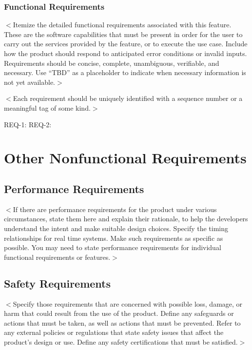 \documentclass{scrreprt}
\begin{document}
\subsection{Functional Requirements}
$<$Itemize the detailed functional requirements associated with this feature.  
These are the software capabilities that must be present in order for the user 
to carry out the services provided by the feature, or to execute the use case.  
Include how the product should respond to anticipated error conditions or 
invalid inputs. Requirements should be concise, complete, unambiguous, 
verifiable, and necessary. Use “TBD” as a placeholder to indicate when necessary 
information is not yet available.$>$

$<$Each requirement should be uniquely identified with a sequence number or a 
meaningful tag of some kind.$>$

REQ-1:  REQ-2:
\fi
\chapter{Other Nonfunctional Requirements}

\section{Performance Requirements}
$<$If there are performance requirements for the product under various 
circumstances, state them here and explain their rationale, to help the 
developers understand the intent and make suitable design choices. Specify the 
timing relationships for real time systems. Make such requirements as specific 
as possible. You may need to state performance requirements for individual 
functional requirements or features.$>$

\section{Safety Requirements}
$<$Specify those requirements that are concerned with possible loss, damage, or 
harm that could result from the use of the product. Define any safeguards or 
actions that must be taken, as well as actions that must be prevented. Refer to 
any external policies or regulations that state safety issues that affect the 
product’s design or use. Define any safety certifications that must be 
satisfied.$>$
\end{document}
